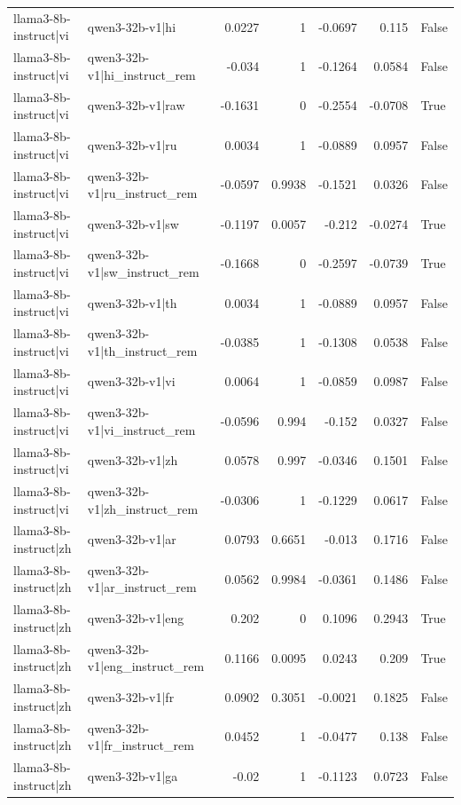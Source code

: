 \begin{table}
\begin{tabular}{l l r r r r l}
llama3-8b-instruct|vi & qwen3-32b-v1|hi & 0.0227 & 1 & -0.0697 & 0.115 & False \\
llama3-8b-instruct|vi & qwen3-32b-v1|hi_instruct_rem & -0.034 & 1 & -0.1264 & 0.0584 & False \\
llama3-8b-instruct|vi & qwen3-32b-v1|raw & -0.1631 & 0 & -0.2554 & -0.0708 & True \\
llama3-8b-instruct|vi & qwen3-32b-v1|ru & 0.0034 & 1 & -0.0889 & 0.0957 & False \\
llama3-8b-instruct|vi & qwen3-32b-v1|ru_instruct_rem & -0.0597 & 0.9938 & -0.1521 & 0.0326 & False \\
llama3-8b-instruct|vi & qwen3-32b-v1|sw & -0.1197 & 0.0057 & -0.212 & -0.0274 & True \\
llama3-8b-instruct|vi & qwen3-32b-v1|sw_instruct_rem & -0.1668 & 0 & -0.2597 & -0.0739 & True \\
llama3-8b-instruct|vi & qwen3-32b-v1|th & 0.0034 & 1 & -0.0889 & 0.0957 & False \\
llama3-8b-instruct|vi & qwen3-32b-v1|th_instruct_rem & -0.0385 & 1 & -0.1308 & 0.0538 & False \\
llama3-8b-instruct|vi & qwen3-32b-v1|vi & 0.0064 & 1 & -0.0859 & 0.0987 & False \\
llama3-8b-instruct|vi & qwen3-32b-v1|vi_instruct_rem & -0.0596 & 0.994 & -0.152 & 0.0327 & False \\
llama3-8b-instruct|vi & qwen3-32b-v1|zh & 0.0578 & 0.997 & -0.0346 & 0.1501 & False \\
llama3-8b-instruct|vi & qwen3-32b-v1|zh_instruct_rem & -0.0306 & 1 & -0.1229 & 0.0617 & False \\
llama3-8b-instruct|zh & qwen3-32b-v1|ar & 0.0793 & 0.6651 & -0.013 & 0.1716 & False \\
llama3-8b-instruct|zh & qwen3-32b-v1|ar_instruct_rem & 0.0562 & 0.9984 & -0.0361 & 0.1486 & False \\
llama3-8b-instruct|zh & qwen3-32b-v1|eng & 0.202 & 0 & 0.1096 & 0.2943 & True \\
llama3-8b-instruct|zh & qwen3-32b-v1|eng_instruct_rem & 0.1166 & 0.0095 & 0.0243 & 0.209 & True \\
llama3-8b-instruct|zh & qwen3-32b-v1|fr & 0.0902 & 0.3051 & -0.0021 & 0.1825 & False \\
llama3-8b-instruct|zh & qwen3-32b-v1|fr_instruct_rem & 0.0452 & 1 & -0.0477 & 0.138 & False \\
llama3-8b-instruct|zh & qwen3-32b-v1|ga & -0.02 & 1 & -0.1123 & 0.0723 & False \\

\end{tabular}
\end{table}
